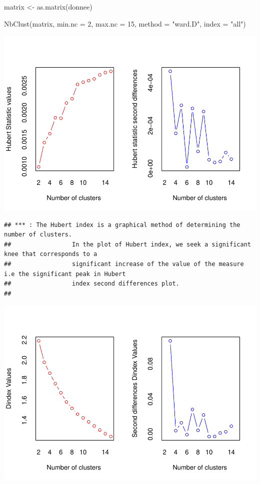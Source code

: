\documentclass[
]{article}
\newenvironment{Shaded}{}{}
\newcommand{\AttributeTok}[1]{#1}
\newcommand{\DecValTok}[1]{#1}
\newcommand{\FunctionTok}[1]{#1}
\newcommand{\NormalTok}[1]{#1}
\newcommand{\OtherTok}[1]{\textcolor[rgb]{1.00,0.25,0.00}{#1}}
\newcommand{\StringTok}[1]{\textcolor[rgb]{0.00,0.50,0.50}{#1}}
\begin{document}
\begin{Shaded}
\begin{Highlighting}[]
\NormalTok{matrix }\OtherTok{\textless{}{-}} \FunctionTok{as.matrix}\NormalTok{(donnee)}
\end{Highlighting}
\end{Shaded}

\begin{Shaded}
\begin{Highlighting}[]
\FunctionTok{NbClust}\NormalTok{(matrix, }\AttributeTok{min.nc =} \DecValTok{2}\NormalTok{, }\AttributeTok{max.nc =} \DecValTok{15}\NormalTok{, }\AttributeTok{method =} \StringTok{"ward.D"}\NormalTok{, }\AttributeTok{index =} \StringTok{"all"}\NormalTok{)}
\end{Highlighting}
\end{Shaded}

\includegraphics{Projet_files/figure-latex/unnamed-chunk-19-1.pdf}

\begin{verbatim}
## *** : The Hubert index is a graphical method of determining the number of clusters.
##                 In the plot of Hubert index, we seek a significant knee that corresponds to a 
##                 significant increase of the value of the measure i.e the significant peak in Hubert
##                 index second differences plot. 
## 
\end{verbatim}

\includegraphics{Projet_files/figure-latex/unnamed-chunk-19-2.pdf}
\end{document}
